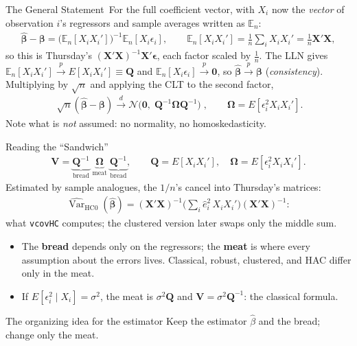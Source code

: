 \documentclass[aspectratio=169,11pt,xcolor=dvipsnames]{beamer}
\DeclareMathOperator{\Var}{Var}
\newcommand{\E}{E}
\newcommand{\En}{\mathbb{E}_n}
\newcommand{\X}{\bm{X}}
\newcommand{\zero}{\bm{0}}
\newcommand{\bhat}{\hat{\bm{\beta}}}
\newcommand{\Om}{\bm{\Omega}}
\newcommand{\dto}{\overset{d}{\longrightarrow}}
\newcommand{\pto}{\overset{p}{\longrightarrow}}
\newcommand{\adv}{\,\raisebox{0.6pt}{\textcolor{accent}{$\bigstar$}}}
\begin{document}
\begin{frame}{The General Statement\adv}
For the full coefficient vector, with $X_i$ now the \emph{vector} of
observation $i$'s regressors and sample averages written as $\En$:
\begin{align*}
  \bhat - \bm\beta
  = \big(\En[X_iX_i']\big)^{-1}\En[X_i\epsilon_i] ,
  \qquad
  \En[X_iX_i'] = \tfrac1n\sum_i X_iX_i' = \tfrac1n \X'\X ,
\end{align*}
so this is Thursday's $(\X'\X)^{-1}\X'\bm\epsilon$, each factor scaled by
$\tfrac1n$. The LLN gives $\En[X_iX_i'] \pto \E[X_iX_i'] \equiv \bm{Q}$ and
$\En[X_i\epsilon_i]\pto \zero$, so $\bhat \pto \bm\beta$ (\emph{consistency}).
Multiplying by $\sqrt n$ and applying the CLT to the second factor,
\begin{align*}
  \boxed{\;\sqrt n(\bhat-\bm\beta) \dto
  \mathcal N\Big(\zero,\; \bm{Q}^{-1}\Om\bm{Q}^{-1}\Big)\;},
  \qquad \Om = \E[\epsilon_i^2 X_iX_i'] .
\end{align*}
\vskip2pt
Note what is \emph{not} assumed: no normality, no homoskedasticity.
\end{frame}

\begin{frame}{Reading the ``Sandwich''\adv}
\begingroup
\setlength{\abovedisplayskip}{2pt}\setlength{\belowdisplayskip}{2pt}
\begin{align*}
  \bm{V} = \underbrace{\bm{Q}^{-1}}_{\text{bread}}\;
           \underbrace{\Om}_{\text{meat}}\;
           \underbrace{\bm{Q}^{-1}}_{\text{bread}},
  \qquad
  \bm Q = \E[X_iX_i'],\quad \Om = \E[\epsilon_i^2X_iX_i'] .
\end{align*}
Estimated by sample analogues, the $1/n$'s cancel into Thursday's matrices:
\begin{align*}
  \widehat{\Var}_{\text{HC0}}(\bhat)
  = (\X'\X)^{-1}\Big(\sum_i \hat e_i^2\, X_iX_i'\Big)(\X'\X)^{-1} :
\end{align*}
what \texttt{vcovHC} computes; the clustered version later swaps only the
middle sum.
\endgroup
\begin{itemize}\itemsep1pt
  \item The \textbf{bread} depends only on the regressors; the \textbf{meat}
        is where every assumption about the errors lives. Classical, robust,
        clustered, and HAC differ \alert{only} in the meat.
  \item If $\E[\epsilon_i^2\mid X_i] = \sigma^2$, the meat is
        $\sigma^2\bm Q$ and $\bm V = \sigma^2\bm Q^{-1}$: the classical
        formula.
\end{itemize}
\vskip3pt
\begin{alertblock}{The organizing idea for the estimator}
Keep the estimator $\hat\beta$ and the bread; change only the meat.
\end{alertblock}
\end{frame}
\end{document}
